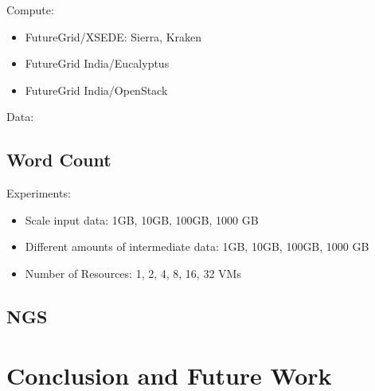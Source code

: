 \documentclass[times]{cpeauth}
\begin{document}
Compute:
\begin{itemize}
	\item FutureGrid/XSEDE: Sierra, Kraken 
	\item FutureGrid India/Eucalyptus
	\item FutureGrid India/OpenStack
\end{itemize}

Data:

	
\subsection{Word Count}

Experiments:
\begin{itemize}
	\item  Scale input data: 1GB, 10GB, 100GB, 1000 GB
	\item  Different amounts of intermediate data: 1GB, 10GB, 100GB, 1000 GB
	\item  Number of Resources: 1, 2, 4, 8, 16, 32 VMs
\end{itemize}

\subsection{NGS}

\section{Conclusion and Future Work}



\end{document}
